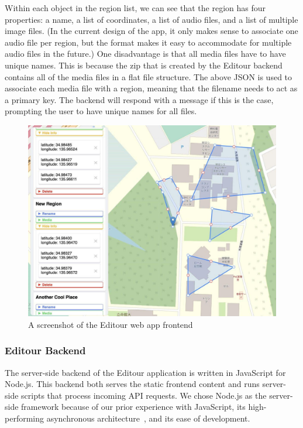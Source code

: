 \documentclass[a4paper, 10pt, american, titlepage]{article}
\begin{document}
Within each object in the region list, we can see that the region has four
properties: a name, a list of coordinates, a list of audio files, and a list of
multiple image files. (In the current design of the app, it only makes sense to
associate one audio file per region, but the format makes it easy to
accommodate for multiple audio files in the future.) One disadvantage is that
all media files have to have unique names. This is because the zip that is
created by the Editour backend contains all of the media files in a flat file
structure. The above JSON is used to associate each media file with a region,
meaning that the filename needs to act as a primary key. The backend will
respond with a message if this is the case, prompting the user to have unique
names for all files.

\begin{figure}[h]
	\centering
	\includegraphics[width=\textwidth]{editour.jpg}
	\caption{A screenshot of the Editour web app frontend}
	\label{fig:editour}
\end{figure}

\subsubsection{Editour Backend}
\label{sec:editourBackend}

The server-side backend of the Editour application is written in JavaScript for
Node.js. This backend both serves the static frontend content and runs
server-side scripts that process incoming API requests.  We chose Node.js as the
server-side framework because of our prior experience with JavaScript, its
high-performing asynchronous architecture~\autocite{orsini2013}, and its ease of
development.
\end{document}
